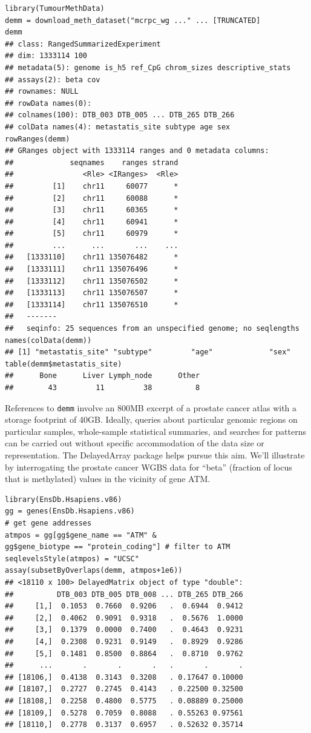 \begin{shaded}
\begin{verbatim}
library(TumourMethData)
demm = download_meth_dataset("mcrpc_wg ..." ... [TRUNCATED] 
demm
## class: RangedSummarizedExperiment 
## dim: 1333114 100 
## metadata(5): genome is_h5 ref_CpG chrom_sizes descriptive_stats
## assays(2): beta cov
## rownames: NULL
## rowData names(0):
## colnames(100): DTB_003 DTB_005 ... DTB_265 DTB_266
## colData names(4): metastatis_site subtype age sex
rowRanges(demm)
## GRanges object with 1333114 ranges and 0 metadata columns:
##             seqnames    ranges strand
##                <Rle> <IRanges>  <Rle>
##         [1]    chr11     60077      *
##         [2]    chr11     60088      *
##         [3]    chr11     60365      *
##         [4]    chr11     60941      *
##         [5]    chr11     60979      *
##         ...      ...       ...    ...
##   [1333110]    chr11 135076482      *
##   [1333111]    chr11 135076496      *
##   [1333112]    chr11 135076502      *
##   [1333113]    chr11 135076507      *
##   [1333114]    chr11 135076510      *
##   -------
##   seqinfo: 25 sequences from an unspecified genome; no seqlengths
names(colData(demm))
## [1] "metastatis_site" "subtype"         "age"             "sex"            
table(demm$metastatis_site)
##      Bone      Liver Lymph_node      Other 
##        43         11         38          8 
\end{verbatim}
\end{shaded}


References to \texttt{demm} involve an 800MB excerpt of a
prostate cancer atlas with a
storage footprint of 40GB.
Ideally,
queries about particular genomic
regions on particular samples, whole-sample statistical summaries,
and searches for patterns can be carried out without
specific accommodation of the data size or representation.
The DelayedArray package helps pursue this aim. We'll illustrate
by interrogating the prostate cancer WGBS data for ``beta''
(fraction of locus that is methylated) values in the vicinity of
gene ATM.

\begin{shaded}
\begin{verbatim}
library(EnsDb.Hsapiens.v86)
gg = genes(EnsDb.Hsapiens.v86)
# get gene addresses
atmpos = gg[gg$gene_name == "ATM" &
gg$gene_biotype == "protein_coding"] # filter to ATM
seqlevelsStyle(atmpos) = "UCSC"
assay(subsetByOverlaps(demm, atmpos+1e6))
## <18110 x 100> DelayedMatrix object of type "double":
##          DTB_003 DTB_005 DTB_008 ... DTB_265 DTB_266
##     [1,]  0.1053  0.7660  0.9206   .  0.6944  0.9412
##     [2,]  0.4062  0.9091  0.9318   .  0.5676  1.0000
##     [3,]  0.1379  0.0000  0.7400   .  0.4643  0.9231
##     [4,]  0.2308  0.9231  0.9149   .  0.8929  0.9286
##     [5,]  0.1481  0.8500  0.8864   .  0.8710  0.9762
##      ...       .       .       .   .       .       .
## [18106,]  0.4138  0.3143  0.3208   . 0.17647 0.10000
## [18107,]  0.2727  0.2745  0.4143   . 0.22500 0.32500
## [18108,]  0.2258  0.4800  0.5775   . 0.08889 0.25000
## [18109,]  0.5278  0.7059  0.8088   . 0.55263 0.97561
## [18110,]  0.2778  0.3137  0.6957   . 0.52632 0.35714
\end{verbatim}
\end{shaded}



